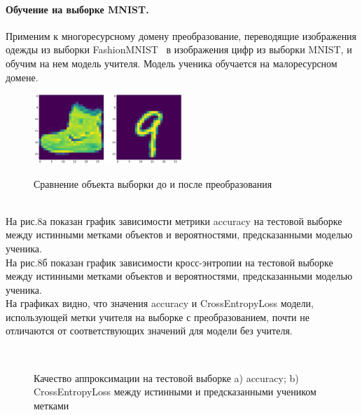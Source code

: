 \newpage
\paragraph{Обучение на выборке MNIST.}
Применим к многоресурсному домену преобразование, переводящие изображения одежды из выборки FashionMNIST~\cite{FMNIST} в изображения цифр из выборки MNIST, и обучим на нем модель учителя. Модель ученика обучается на малоресурсном домене.\\
\begin{figure}[h!t]\center
{\includegraphics[width=0.5\textwidth]{results/mnist}}
\caption{Сравнение объекта выборки до и после преобразования}
\end{figure}\\
На рис.8а показан график зависимости метрики accuracy на тестовой выборке между истинными метками объектов и вероятностями, предсказанными моделью ученика.\\
На рис.8б показан график зависимости кросс-энтропии на тестовой выборке между истинными метками объектов и вероятностями, предсказанными моделью ученика.\\
На графиках видно, что значения accuracy и CrossEntropyLoss модели, использующей метки учителя на выборке с преобразованием, почти не отличаются от соответствующих значений для модели без учителя.
\begin{figure}[h!t]\center
{}
\\
\caption{Качество аппроксимации на тестовой выборке a) accuracy; b) CrossEntropyLoss между истинными и предсказанными учеником метками}
\end{figure}
